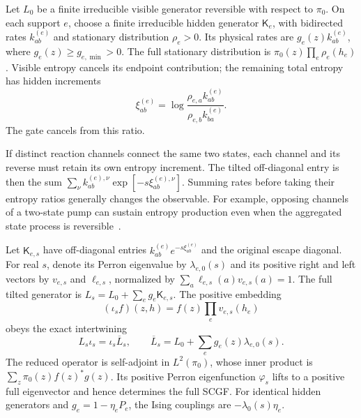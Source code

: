 \documentclass[aps,pre,reprint,amsmath,amssymb,longbibliography,floatfix]{revtex4-2}
\begin{document}
Let $L_0$ be a finite irreducible visible generator reversible with respect
to $\pi_0$. On each support $e$, choose a finite irreducible hidden
generator $\mathsf K_e$, with bidirected rates $k^{(e)}_{ab}$ and stationary
distribution $\rho_e>0$. Its physical rates are
$g_e(z)k^{(e)}_{ab}$, where $g_e(z)\ge g_{e,\min}>0$.
The full stationary distribution is
$\pi_0(z)\prod_e\rho_e(h_e)$.
Visible entropy cancels its endpoint contribution; the remaining
total entropy has hidden increments
\begin{equation}
 \xi^{(e)}_{ab}
 =\log\frac{\rho_{e,a}k^{(e)}_{ab}}
               {\rho_{e,b}k^{(e)}_{ba}}.
 \label{eq:hidden-general-mark}
\end{equation}
The gate cancels from this ratio.

If distinct reaction channels connect the same two states, each channel and its reverse must retain its own entropy increment. The tilted off-diagonal entry is then the sum
$\sum_\nu k_{ab}^{(e),\nu}\exp\left[-s\xi_{ab}^{(e),\nu}\right]$.
Summing rates before taking their entropy ratios generally changes the observable. For example, opposing channels of a two-state pump can sustain entropy production even when the aggregated state process is reversible~\cite{Kaneko2026KineticLocking}.

Let $\mathsf K_{e,s}$ have off-diagonal entries
$k^{(e)}_{ab}e^{-s\xi^{(e)}_{ab}}$ and the original escape diagonal.
For real $s$, denote its Perron eigenvalue by $\lambda_{e,0}(s)$ and
its positive right and left vectors by $v_{e,s}$ and $\ell_{e,s}$,
normalized by $\sum_a\ell_{e,s}(a)v_{e,s}(a)=1$.
The full tilted generator is
$L_s=L_0+\sum_e g_e\mathsf K_{e,s}$.
The positive embedding
\begin{equation}
 (\iota_s f)(z,h)=f(z)\prod_e v_{e,s}(h_e)
 \label{eq:hidden-general-lift}
\end{equation}
obeys the exact intertwining
\begin{equation}
 L_s\iota_s=\iota_s\overline L_s,\qquad
 \overline L_s=L_0+\sum_e g_e(z)\lambda_{e,0}(s).
 \label{eq:hidden-general-reduction}
\end{equation}
The reduced operator is self-adjoint in $L^2(\pi_0)$, whose inner
product is $\sum_z\pi_0(z)f(z)^*g(z)$.
Its positive Perron eigenfunction $\varphi_s$ lifts to a positive
full eigenvector and hence determines the full SCGF.
For identical hidden generators and $g_e=1-\eta_eP_e$, the Ising
couplings are $-\lambda_0(s)\eta_e$.
\end{document}

